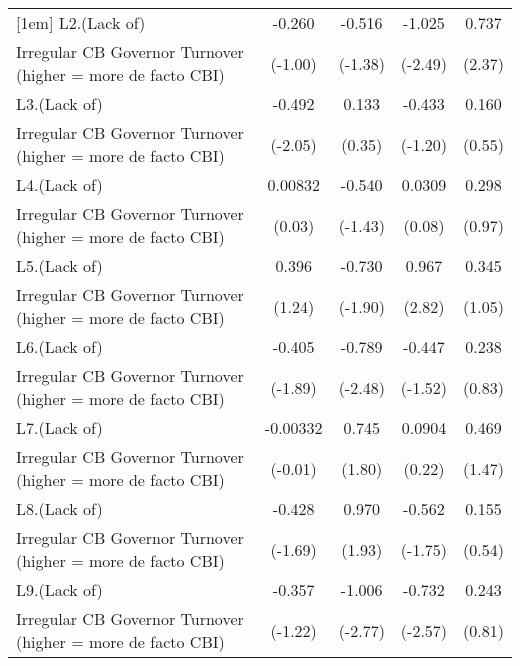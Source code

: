 {\begin{tabular}{l*{4}{c}}
[1em]
L2.(Lack of)        &      -0.260         &      -0.516         &      -1.025\sym{*}  &       0.737\sym{*}  \\
Irregular CB Governor Turnover (higher = more de facto CBI)&     (-1.00)         &     (-1.38)         &     (-2.49)         &      (2.37)         \\
[1em]
L3.(Lack of)        &      -0.492\sym{*}  &       0.133         &      -0.433         &       0.160         \\
Irregular CB Governor Turnover (higher = more de facto CBI)&     (-2.05)         &      (0.35)         &     (-1.20)         &      (0.55)         \\
[1em]
L4.(Lack of)        &     0.00832         &      -0.540         &      0.0309         &       0.298         \\
Irregular CB Governor Turnover (higher = more de facto CBI)&      (0.03)         &     (-1.43)         &      (0.08)         &      (0.97)         \\
[1em]
L5.(Lack of)        &       0.396         &      -0.730         &       0.967\sym{**} &       0.345         \\
Irregular CB Governor Turnover (higher = more de facto CBI)&      (1.24)         &     (-1.90)         &      (2.82)         &      (1.05)         \\
[1em]
L6.(Lack of)        &      -0.405         &      -0.789\sym{*}  &      -0.447         &       0.238         \\
Irregular CB Governor Turnover (higher = more de facto CBI)&     (-1.89)         &     (-2.48)         &     (-1.52)         &      (0.83)         \\
[1em]
L7.(Lack of)        &    -0.00332         &       0.745         &      0.0904         &       0.469         \\
Irregular CB Governor Turnover (higher = more de facto CBI)&     (-0.01)         &      (1.80)         &      (0.22)         &      (1.47)         \\
[1em]
L8.(Lack of)        &      -0.428         &       0.970         &      -0.562         &       0.155         \\
Irregular CB Governor Turnover (higher = more de facto CBI)&     (-1.69)         &      (1.93)         &     (-1.75)         &      (0.54)         \\
[1em]
L9.(Lack of)        &      -0.357         &      -1.006\sym{**} &      -0.732\sym{*}  &       0.243         \\
Irregular CB Governor Turnover (higher = more de facto CBI)&     (-1.22)         &     (-2.77)         &     (-2.57)         &      (0.81)         \\

\end{tabular}}
